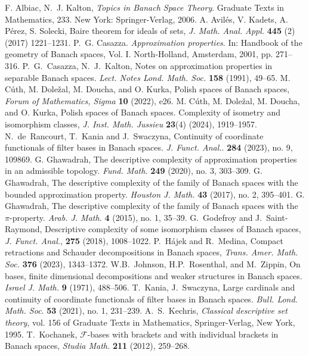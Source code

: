 \documentclass[12pt,fleqn]{amsart}
\theoremstyle{definition}
\theoremstyle{remark}
\begin{document}
\begin{thebibliography}{}
 F. Albiac, N.~J. Kalton, \emph{Topics in Banach Space Theory}. Graduate Texts in Mathematics, 233. New York: Springer-Verlag, 2006.
 A. Avil\'es, V. Kadets, A. P\'erez, S. Solecki, Baire theorem for ideals of sets, \emph{J. Math. Anal. Appl.} \textbf{445} (2) (2017) 1221--1231.
 P.~G. Casazza. \emph{Approximation properties}. In: Handbook of the geometry of Banach spaces, Vol. I. North-Holland, Amsterdam, 2001, pp. 271--316.
 P.~G.~Casazza, N.~J.~Kalton, Notes on approximation properties in separable Banach spaces. \emph{Lect. Notes Lond. Math. Soc.} \textbf{158} (1991), 49--65. 
 M. C\'{u}th, M. Dole\v{z}al, M. Doucha, and O. Kurka, Polish spaces of Banach spaces, \emph{Forum of Mathematics, Sigma} \textbf{10} (2022), e26.
 M. C\'{u}th, M. Dole\v{z}al, M. Doucha, and O. Kurka, Polish spaces of Banach spaces. Complexity of isometry and isomorphism classes, \emph{J. Inst. Math. Jussieu} \textbf{23}(4) (2024), 1919--1957.
 N.~de~Rancourt, T.~Kania and J.~Swaczyna, Continuity of coordinate functionals of filter bases in Banach spaces. \emph{J. Funct. Anal.}. \textbf{284} (2023), no. 9, 109869.
 G. Ghawadrah, The descriptive complexity of approximation properties in an admissible topology. \emph{Fund. Math.} \textbf{249} (2020), no. 3, 303–309.
 G. Ghawadrah, The descriptive complexity of the family of Banach spaces with the bounded approximation property. \emph{Houston J. Math.} \textbf{43} (2017), no. 2, 395–401.
 G. Ghawadrah, The descriptive complexity of the family of Banach spaces with the $\pi$-property. \emph{Arab. J. Math.} \textbf{4} (2015), no. 1, 35--39.
 G.~Godefroy and J.~Saint-Raymond, Descriptive complexity of some isomorphism classes of Banach spaces, \emph{J. Funct. Anal.}, \textbf{275} (2018), 1008--1022.
P.~H\'ajek and R.~Medina, 
Compact retractions and Schauder decompositions in Banach spaces, 
\emph{Trans. Amer. Math. Soc.} \textbf{376} (2023), 1343--1372. 
  W.B.~Johnson, H.P.~Rosenthal, and M.~Zippin, On bases, finite dimensional decompositions and weaker structures in Banach spaces. \emph{Israel J. Math.} \textbf{9} (1971), 488--506.
 T.~Kania, J.~Swaczyna, Large cardinals and continuity of coordinate functionals of filter bases in Banach spaces. \emph{Bull. Lond. Math. Soc}. \textbf{53} (2021), no. 1, 231--239.
 A.~S.~Kechris, \emph{Classical descriptive set theory}, vol. 156 of Graduate Texts in Mathematics, Springer-Verlag, New York, 1995.
 T.~Kochanek, $\mathcal{F}$-bases with brackets and with individual brackets in Banach spaces, \emph{Studia Math.} \textbf{211} (2012), 259--268.

\end{thebibliography}
\end{document}
